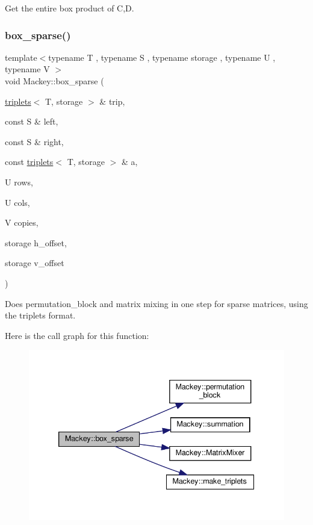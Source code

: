 Get the entire box product of C,D. 

\mbox{\label{namespaceMackey_a94aab405619cb172fe79ab5fc68a4fac}} 
\subsubsection{\texorpdfstring{box\+\_\+sparse()}{box\_sparse()}}
{\footnotesize\ttfamily template$<$typename T , typename S , typename storage , typename U , typename V $>$ \\
void Mackey\+::box\+\_\+sparse (\begin{DoxyParamCaption}\item[{\hyperlink{namespaceMackey_a0b8cd52f81199d53fa1e93946d8115ef}{triplets}$<$ T, storage $>$ \&}]{trip,  }\item[{const S \&}]{left,  }\item[{const S \&}]{right,  }\item[{const \hyperlink{namespaceMackey_a0b8cd52f81199d53fa1e93946d8115ef}{triplets}$<$ T, storage $>$ \&}]{a,  }\item[{U}]{rows,  }\item[{U}]{cols,  }\item[{V}]{copies,  }\item[{storage}]{h\+\_\+offset,  }\item[{storage}]{v\+\_\+offset }\end{DoxyParamCaption})}



Does permutation\+\_\+block and matrix mixing in one step for sparse matrices, using the triplets format. 

Here is the call graph for this function\+:\nopagebreak
\begin{figure}[H]
\begin{center}
\leavevmode
\includegraphics[width=339pt]{namespaceMackey_a94aab405619cb172fe79ab5fc68a4fac_cgraph}
\end{center}
\end{figure}
\mbox{\label{namespaceMackey_a232e85ca1fb9017788b33b7f6f2c269b}} 
